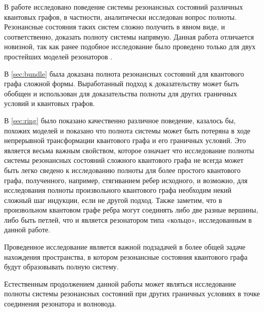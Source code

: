 \startconclusionpage

В работе исследовано поведение системы резонансных состояний различных квантовых графов, в частности, аналитически исследован вопрос полноты. Резонансные состояния таких систем сложно получить в явном виде, и соответственно, доказать полноту системы напрямую. Данная работа отличается новизной, так как ранее подобное исследование было проведено только для двух простейших моделей резонаторов \cite{spectralpavlov16}.

В \autoref{sec:bundle} была доказана полнота резонансных состояний для квантового графа сложной формы. Выработанный подход к доказательству может быть обобщен и использован для доказательства полноты для других граничных условий и квантовых графов.

В \autoref{sec:ring} было показано качественно различное поведение, казалось бы, похожих моделей и показано что полнота системы может быть потеряна в ходе непрерывной трансформации квантового графа и его граничных условий. Это является весьма важным свойством, которое означает что исследование полноты системы резонансных состояний сложного квантового графа не всегда может быть легко сведено к исследованию полноты для более простого квантового графа, полученного, например, стягиванием ребер исходного, и возможно, для исследования полноты произвольного квантового графа необходим некий сложный шаг индукции, если не другой подход. Также заметим, что в произвольном квантовом графе ребра могут соединять либо две разные вершины, либо быть петлей, что и является резонатором типа «кольцо», исследованным в данной работе. 

Проведенное исследование является важной подзадачей в более общей задаче нахождения пространства, в котором резонансные состояния квантового графа будут образовывать полную систему.

Естественным продолжением данной работы может являться исследование полноты системы резонансных состояний при других граничных условиях в точке соединения резонатора и волновода.
